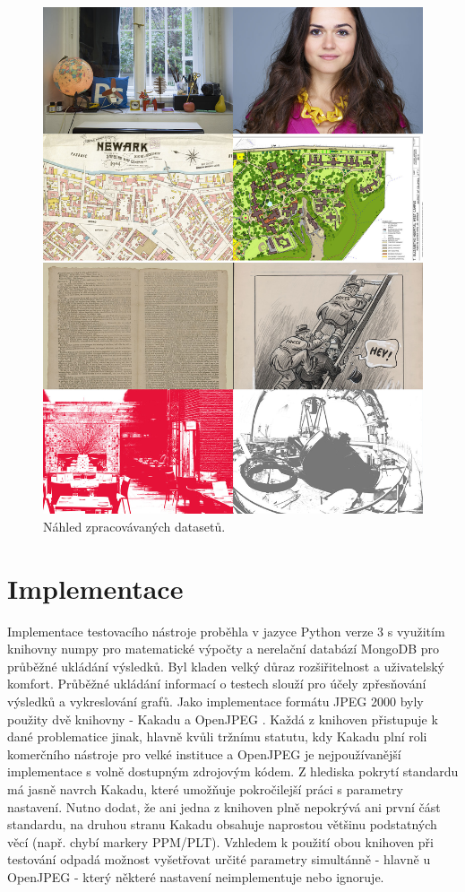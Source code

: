 \vspace{3.5cm}
\begin{figure}[hbt!]
  \centering
  \hspace*{-0.75cm}
  \includegraphics[width=16cm]{obrazky-figures/fotky.jpg}
  \caption{Náhled zpracovávaných datasetů.}
  \label{keepCalm}
\end{figure}


\clearpage
\newpage
\section{Implementace} 
Implementace testovacího nástroje proběhla v jazyce Python verze 3 s využitím knihovny numpy pro matematické výpočty a nerelační databází MongoDB pro průběžné ukládání výsledků. Byl kladen velký důraz rozšiřitelnost a uživatelský komfort. Průběžné ukládání informací o testech slouží pro účely zpřesňování výsledků a vykreslování grafů. Jako implementace formátu JPEG 2000 byly použity dvě knihovny - Kakadu \cite{kakadu_docs} a OpenJPEG \cite{open_docs}. Každá z knihoven přistupuje k dané problematice jinak, hlavně kvůli tržnímu statutu, kdy Kakadu plní roli komerčního nástroje pro velké instituce a OpenJPEG je nejpoužívanější implementace s volně dostupným zdrojovým kódem. Z hlediska pokrytí standardu má jasně navrch Kakadu, které umožňuje pokročilejší práci s parametry nastavení. Nutno dodat, že ani jedna z knihoven plně nepokrývá ani první část standardu, na druhou stranu Kakadu obsahuje naprostou většinu podstatných věcí (např. chybí markery PPM/PLT). Vzhledem k použití obou knihoven při testování odpadá možnost vyšetřovat určité parametry simultánně - hlavně u OpenJPEG - který některé nastavení neimplementuje nebo ignoruje.

